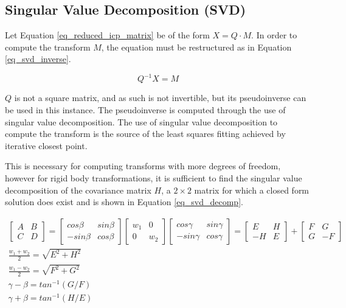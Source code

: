 \documentclass[sigconf]{acmart/acmart}
\begin{document}
\subsection{Singular Value Decomposition (SVD)}

Let Equation \ref{eq_reduced_icp_matrix} be of the form $X=Q \cdot M$. In order to compute the transform $M$, the equation must be restructured as in Equation \ref{eq_svd_inverse}.

\begin{equation}
Q^{-1} X = M
\label{eq_svd_inverse}
\end{equation}

$Q$ is not a square matrix, and as such is not invertible, but its pseudoinverse can be used in this instance. The pseudoinverse is computed through the use of singular value decomposition. The use of singular value decomposition to compute the transform is the source of the least squares fitting achieved by iterative closest point.

This is necessary for computing transforms with more degrees of freedom, however for rigid body transformations, it is sufficient to find the singular value decomposition of the covariance matrix $H$, a $2 \times 2$ matrix for which a closed form solution does exist\cite{blinn_consider_1996} and is shown in Equation \ref{eq_svd_decomp}.

\begin{equation}
\begin{gathered}
	\begin{bmatrix}
	A & B \\
	C & D
	\end{bmatrix}
	=
	\begin{bmatrix}
	cos\beta & sin\beta \\
	-sin\beta & cos\beta
	\end{bmatrix}
	\begin{bmatrix}
	w_1 & 0 \\
	0 & w_2
	\end{bmatrix}
	\begin{bmatrix}
	cos\gamma & sin\gamma \\
	-sin\gamma & cos\gamma
	\end{bmatrix}
	=
	\begin{bmatrix}
	E & H \\
	-H & E
	\end{bmatrix}
	+
	\begin{bmatrix}
	F & G \\
	G & -F
	\end{bmatrix}
	\\
	\frac{w_1 + w_2}{2} = \sqrt{E^2 + H^2}
	\\
	\frac{w_1 - w_2}{2} = \sqrt{F^2 + G^2}
	\\
	\gamma - \beta = tan^{-1}(G/F)
	\\
	\gamma + \beta = tan^{-1}(H/E)
\end{gathered}
\label{eq_svd_decomp}
\end{equation}
\end{document}
